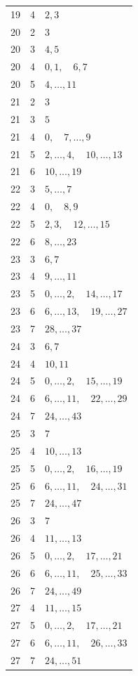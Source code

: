 \begin{longtable}{ccl}
19 & 4 & $2,3$\\
20 & 2 & $3$\\
20 & 3 & $4,5$\\
20 & 4 & $0,1,\quad 6,7$\\
20 & 5 & $4,\ldots,11$\\
21 & 2 & $3$\\
21 & 3 & $5$\\
21 & 4 & $0,\quad 7,\ldots,9$\\
21 & 5 & $2,\ldots,4,\quad 10,\ldots,13$\\
21 & 6 & $10,\ldots,19$\\
22 & 3 & $5,\ldots,7$\\
22 & 4 & $0,\quad 8,9$\\
22 & 5 & $2,3,\quad 12,\ldots,15$\\
22 & 6 & $8,\ldots,23$\\
23 & 3 & $6,7$\\
23 & 4 & $9,\ldots,11$\\
23 & 5 & $0,\ldots,2,\quad 14,\ldots,17$\\
23 & 6 & $6,\ldots,13,\quad 19,\ldots,27$\\
23 & 7 & $28,\ldots,37$\\
24 & 3 & $6,7$\\
24 & 4 & $10,11$\\
24 & 5 & $0,\ldots,2,\quad 15,\ldots,19$\\
24 & 6 & $6,\ldots,11,\quad 22,\ldots,29$\\
24 & 7 & $24,\ldots,43$\\
25 & 3 & $7$\\
25 & 4 & $10,\ldots,13$\\
25 & 5 & $0,\ldots,2,\quad 16,\ldots,19$\\
25 & 6 & $6,\ldots,11,\quad 24,\ldots,31$\\
25 & 7 & $24,\ldots,47$\\
26 & 3 & $7$\\
26 & 4 & $11,\ldots,13$\\
26 & 5 & $0,\ldots,2,\quad 17,\ldots,21$\\
26 & 6 & $6,\ldots,11,\quad 25,\ldots,33$\\
26 & 7 & $24,\ldots,49$\\
27 & 4 & $11,\ldots,15$\\
27 & 5 & $0,\ldots,2,\quad 17,\ldots,21$\\
27 & 6 & $6,\ldots,11,\quad 26,\ldots,33$\\
27 & 7 & $24,\ldots,51$\\

\end{longtable}
